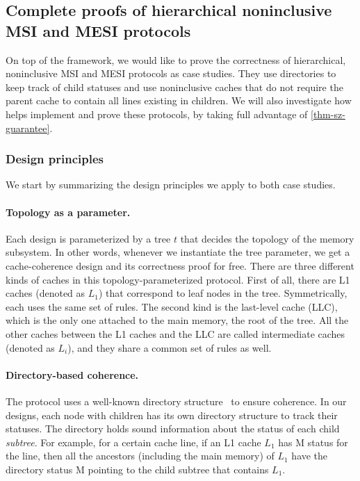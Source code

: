 \subsection{Complete proofs of hierarchical noninclusive MSI and MESI protocols}

On top of the \hemiola{} framework, we would like to prove the correctness of hierarchical, noninclusive MSI and MESI protocols as case studies.
They use directories to keep track of child statuses and use noninclusive caches that do not require the parent cache to contain all lines existing in children.
We will also investigate how \hemiola{} helps implement and prove these protocols, by taking full advantage of \autoref{thm-sz-guarantee}.

\subsubsection{Design principles}
We start by summarizing the design principles we apply to both case studies.

\paragraph{Topology as a parameter.}

Each design is parameterized by a tree $t$ that decides the topology of the memory subsystem.
In other words, whenever we instantiate the tree parameter, we get a cache-coherence design and its correctness proof for free.
There are three different kinds of caches in this topology-parameterized protocol.
First of all, there are L1 caches (denoted as $L_1$) that correspond to leaf nodes in the tree.
Symmetrically, each uses the same set of rules.
The second kind is the last-level cache (LLC), which is the only one attached to the main memory, the root of the tree.
All the other caches between the L1 caches and the LLC are called intermediate caches (denoted as $L_i$), and they share a common set of rules as well.

\paragraph{Directory-based coherence.}

The protocol uses a well-known directory structure~\cite{Tang:1976} to ensure coherence.
In our designs, each node with children has its own directory structure to track their statuses.
The directory holds sound information about the status of each child \emph{subtree}.
For example, for a certain cache line, if an L1 cache $L_1$ has M status for the line, then all the ancestors (including the main memory) of $L_1$ have the directory status M pointing to the child subtree that contains $L_1$.

